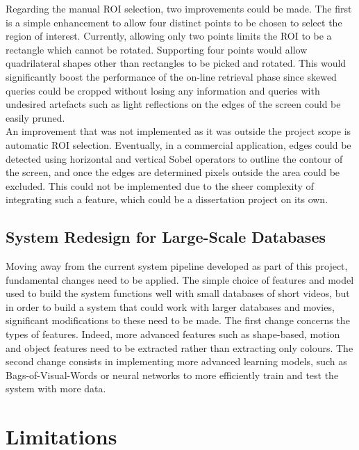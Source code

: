 Regarding the manual ROI selection, two improvements could be made. The first is a simple enhancement to allow four distinct points to be chosen to select the region of interest. Currently, allowing only two points limits the ROI to be a rectangle which cannot be rotated. Supporting four points would allow quadrilateral shapes other than rectangles to be picked and rotated. This would significantly boost the performance of the on-line retrieval phase since skewed queries could be cropped without losing any information and queries with undesired artefacts such as light reflections on the edges of the screen could be easily pruned.\\

An improvement that was not implemented as it was outside the project scope is automatic ROI selection. Eventually, in a commercial application, edges could be detected using horizontal and vertical Sobel operators to outline the contour of the screen, and once the edges are determined pixels outside the area could be excluded. This could not be implemented due to the sheer complexity of integrating such a feature, which could be a dissertation project on its own.

\subsection{System Redesign for Large-Scale Databases}

Moving away from the current system pipeline developed as part of this project, fundamental changes need to be applied. The simple choice of features and model used to build the system functions well with small databases of short videos, but in order to build a system that could work with larger databases and movies, significant modifications to these need to be made. The first change concerns the types of features. Indeed, more advanced features such as shape-based, motion and object features need to be extracted rather than extracting only colours. The second change consists in implementing more advanced learning models, such as Bags-of-Visual-Words or neural networks to more efficiently train and test the system with more data. 


\section{Limitations}
\label{sec:conclusions-limitations}

